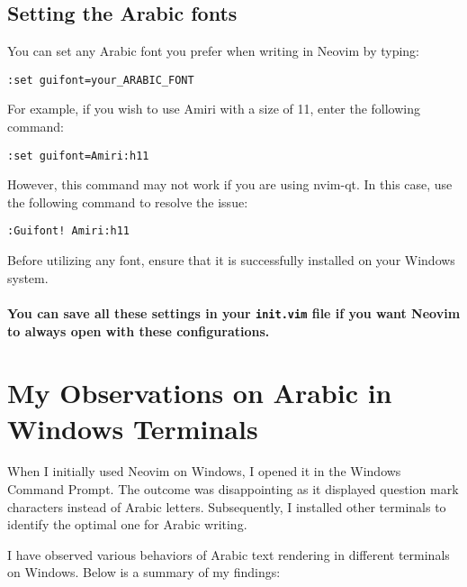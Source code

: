 \documentclass[12pt, letterpaper]{article}
\begin{document}
\subsection{Setting the Arabic fonts}

You can set any Arabic font you prefer when writing in Neovim by typing:
\begin{center}
\begin{verbatim}
:set guifont=your_ARABIC_FONT
\end{verbatim}
\end{center}
For example, if you wish to use Amiri with a size of 11, enter the following command:
\begin{center}
\begin{verbatim}
:set guifont=Amiri:h11
\end{verbatim}
\end{center}

However, this command may not work if you are using nvim-qt. In this case, use the following command to resolve the issue:
\begin{center}
\begin{verbatim}
:Guifont! Amiri:h11
\end{verbatim}
\end{center}

Before utilizing any font, ensure that it is successfully installed on your Windows system.



\paragraph{You can save all these settings in your \texttt{init.vim} file if you want Neovim to always open with these configurations.}


 \section{My Observations on Arabic in Windows Terminals}

When I initially used Neovim on Windows, I opened it in the Windows Command Prompt. The outcome was disappointing as it displayed question mark characters instead of Arabic letters. Subsequently, I installed other terminals to identify the optimal one for Arabic writing.

I have observed various behaviors of Arabic text rendering in different terminals on Windows. Below is a summary of my findings:
\end{document}
